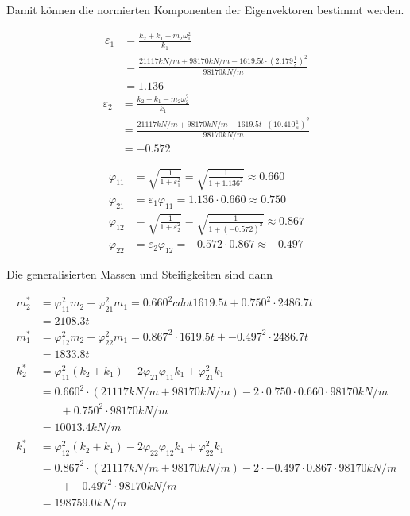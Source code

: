 Damit können die normierten Komponenten der Eigenvektoren bestimmt werden.

\begin{align*}
\varepsilon_1 &= \frac{k_2 + k_1 - m_2 \omega_1^2}{k_1} \\
              &= \frac{21117 kN/m + 98170 kN/m - 1619.5 t \cdot (2.179 \frac{1}{s})^2}{98170 kN/m}\\
              &= 1.136
\end{align*}
\begin{align*}
\varepsilon_2 &= \frac{k_2 + k_1 - m_2 \omega_2^2}{k_1} \\
              &= \frac{21117 kN/m + 98170 kN/m - 1619.5 t \cdot (10.410 \frac{1}{s})^2}{98170 kN/m}\\
              &= -0.572
\end{align*}

\begin{align*}
\varphi_{11} &= \sqrt{\frac{1}{1 + \varepsilon_1^2}} = \sqrt{\frac{1}{1 + 1.136^2}} \approx 0.660\\
\varphi_{21} &= \varepsilon_1 \varphi_{11} = 1.136 \cdot 0.660 \approx 0.750\\
\varphi_{12} &= \sqrt{\frac{1}{1 + \varepsilon_2^2}} = \sqrt{\frac{1}{1 + (-0.572)^2}} \approx 0.867\\
\varphi_{22} &= \varepsilon_2 \varphi_{12} = -0.572 \cdot 0.867 \approx -0.497
\end{align*}

Die generalisierten Massen und Steifigkeiten sind dann

\begin{align*}
m_2^* &= \varphi_{11}^2 m_2 + \varphi_{21}^2 m_1 = 0.660^2 cdot 1619.5 t + 0.750^2 \cdot 2486.7 t\\
      &= 2108.3 t\\[2em]
m_1^* &= \varphi_{12}^2 m_2 + \varphi_{22}^2 m_1 = 0.867^2 \cdot 1619.5 t + -0.497^2 \cdot 2486.7 t\\
      &= 1833.8 t\\[2em]
k_2^* &= \varphi_{11}^2 (k_2 + k_1) - 2 \varphi_{21} \varphi_{11} k_1 + \varphi_{21}^2 k_1\\
      &= 0.660^2 \cdot (21117 kN/m +  98170 kN/m) - 2 \cdot 0.750 \cdot 0.660 \cdot 98170 kN/m\\
      &\phantom{{}=1} + 0.750^2 \cdot  98170 kN/m\\
      &= 10013.4 kN/m\\[2em]
k_1^* &= \varphi_{12}^2 (k_2 + k_1) - 2 \varphi_{22} \varphi_{12} k_1 + \varphi_{22}^2 k_1\\
      &= 0.867^2 \cdot (21117 kN/m +  98170 kN/m) - 2 \cdot -0.497 \cdot 0.867 \cdot 98170 kN/m\\
      &\phantom{{}=1} + -0.497^2 \cdot 98170 kN/m\\
      &= 198759.0 kN/m
\end{align*}


